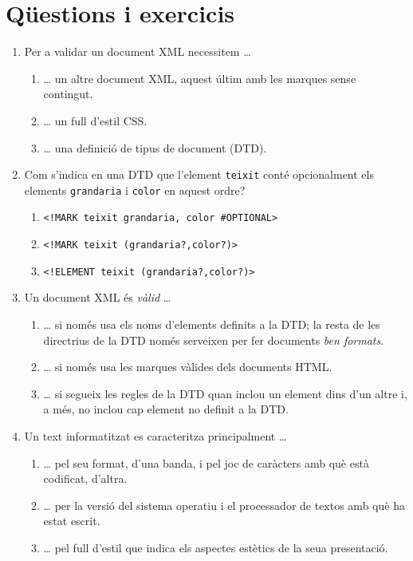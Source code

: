 \section{Qüestions i exercicis}
\begin{enumerate}
\item Per a validar un document XML necessitem {\ldots}
  \begin{enumerate}
  \item {\ldots} un altre document XML, aquest últim amb les marques
    sense contingut.
  \item {\ldots} un full d'estil CSS.
  \item {\ldots} una definició de tipus de document (DTD).
  \end{enumerate}

\item Com s'indica en una DTD que l'element \texttt{teixit} conté
  opcionalment els elements \texttt{grandaria} i \texttt{color} en
  aquest ordre?
  \begin{enumerate}
  \item \verb|<!MARK teixit grandaria, color #OPTIONAL>|
  \item \verb|<!MARK teixit (grandaria?,color?)>|
  \item \verb|<!ELEMENT teixit (grandaria?,color?)>|
  \end{enumerate}

\item Un document XML és \emph{vàlid} {\ldots}
  \begin{enumerate}
  \item {\ldots} si només usa els noms d'elements definits a la DTD;
    la resta de les directrius de la DTD només serveixen per fer
    documents \emph{ben formats}.
  \item {\ldots} si només usa les marques vàlides dels documents HTML.
  \item {\ldots} si segueix les regles de la DTD quan inclou un
    element dins d'un altre i, a més, no inclou cap element no definit
    a la DTD.
\end{enumerate}

\item Un text informatitzat es caracteritza principalment {\ldots}
  \begin{enumerate}
  \item {\ldots} pel seu format, d'una banda, i pel joc de caràcters
    amb què està codificat, d'altra.
  \item {\ldots} per la versió del sistema operatiu i el processador
    de textos amb què ha estat escrit.
  \item {\ldots} pel full d'estil que indica els aspectes estètics de
    la seua presentació.
\end{enumerate}


\end{enumerate}
